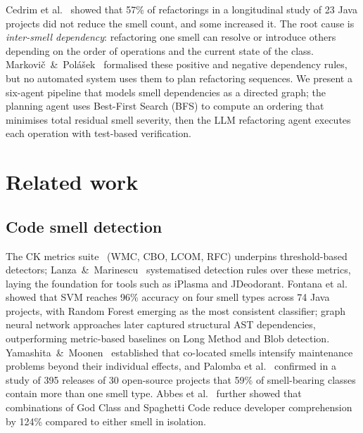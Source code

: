 \documentclass[conference]{IEEEtran}
\begin{document}
Cedrim et al.~\cite{cedrim2017} showed that 57\% of refactorings in a
longitudinal study of 23 Java projects did not reduce the smell count,
and some increased it.
The root cause is \textit{inter-smell dependency}: refactoring one smell can
resolve or introduce others depending on the order of operations and the
current state of the class.
Markovič~\&~Polášek~\cite{markovic2016refaktorovanie} formalised these
positive and negative dependency rules, but no automated system uses them to
plan refactoring sequences.
We present a six-agent pipeline that models smell dependencies as a directed
graph; the planning agent uses Best-First Search (BFS) to compute an ordering
that minimises total residual smell severity, then the LLM refactoring agent
executes each operation with test-based verification.

\section{Related work}

\subsection{Code smell detection}

The CK metrics suite~\cite{chidamber1994metrics} (WMC, CBO, LCOM, RFC)
underpins threshold-based detectors; Lanza~\&~Marinescu~\cite{lanza2006object}
systematised detection rules over these metrics, laying the foundation for
tools such as iPlasma and JDeodorant.
Fontana et al.~\cite{fontana2016comparing} showed that SVM reaches 96\%
accuracy on four smell types across 74 Java projects, with Random Forest
emerging as the most consistent classifier; graph neural network approaches
later captured structural AST dependencies, outperforming metric-based
baselines on Long Method and Blob detection.
Yamashita~\&~Moonen~\cite{yamashita2013exploring} established that co-located
smells intensify maintenance problems beyond their individual effects, and
Palomba et al.~\cite{palomba2018diffuseness} confirmed in a study of 395
releases of 30 open-source projects that 59\% of smell-bearing classes contain
more than one smell type.
Abbes et al.~\cite{abbes2011empirical} further showed that combinations of God
Class and Spaghetti Code reduce developer comprehension by 124\% compared to
either smell in isolation.
\end{document}
